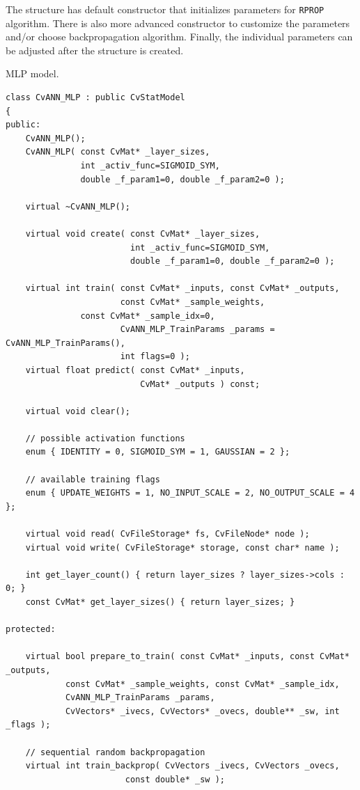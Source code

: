 The structure has default constructor that initializes parameters for \texttt{RPROP} algorithm. There is also more advanced constructor to customize the parameters and/or choose backpropagation algorithm. Finally, the individual parameters can be adjusted after the structure is created.


MLP model.

\begin{lstlisting}
class CvANN_MLP : public CvStatModel
{
public:
    CvANN_MLP();
    CvANN_MLP( const CvMat* _layer_sizes,
               int _activ_func=SIGMOID_SYM,
               double _f_param1=0, double _f_param2=0 );

    virtual ~CvANN_MLP();

    virtual void create( const CvMat* _layer_sizes,
                         int _activ_func=SIGMOID_SYM,
                         double _f_param1=0, double _f_param2=0 );

    virtual int train( const CvMat* _inputs, const CvMat* _outputs,
                       const CvMat* _sample_weights, 
		       const CvMat* _sample_idx=0,
                       CvANN_MLP_TrainParams _params = CvANN_MLP_TrainParams(),
                       int flags=0 );
    virtual float predict( const CvMat* _inputs,
                           CvMat* _outputs ) const;

    virtual void clear();

    // possible activation functions
    enum { IDENTITY = 0, SIGMOID_SYM = 1, GAUSSIAN = 2 };

    // available training flags
    enum { UPDATE_WEIGHTS = 1, NO_INPUT_SCALE = 2, NO_OUTPUT_SCALE = 4 };

    virtual void read( CvFileStorage* fs, CvFileNode* node );
    virtual void write( CvFileStorage* storage, const char* name );

    int get_layer_count() { return layer_sizes ? layer_sizes->cols : 0; }
    const CvMat* get_layer_sizes() { return layer_sizes; }

protected:

    virtual bool prepare_to_train( const CvMat* _inputs, const CvMat* _outputs,
            const CvMat* _sample_weights, const CvMat* _sample_idx,
            CvANN_MLP_TrainParams _params,
            CvVectors* _ivecs, CvVectors* _ovecs, double** _sw, int _flags );

    // sequential random backpropagation
    virtual int train_backprop( CvVectors _ivecs, CvVectors _ovecs, 
						const double* _sw );


\end{lstlisting}
